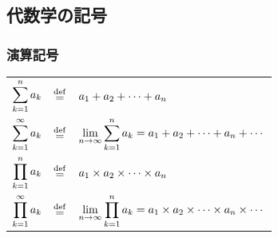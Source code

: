 \documentclass[a4j, 9pt]{ltjsarticle}
\begin{document}
    \subsection{代数学の記号}
      \subsubsection{演算記号}

        \begin{center}
          \begin{tablehere}
            \centering
            \begin{tabular}{rcl}
              
              $\displaystyle \sum_{k=1}^n a_k$      & $\displaystyle \stackrel{\mathrm{def}}{=}$  & $\displaystyle a_1 + a_2 + \cdots + a_n$\\ 
              $\displaystyle \sum_{k=1}^\infty a_k$ & $\displaystyle \stackrel{\mathrm{def}}{=}$  & $\displaystyle \lim_{n \to \infty}\sum_{k=1}^n a_k = a_1 + a_2 + \cdots + a_n + \cdots$\\ 
              $\displaystyle \prod_{k=1}^n a_k$     & $\displaystyle \stackrel{\mathrm{def}}{=}$  & $\displaystyle a_1 \times a_2 \times \cdots \times a_n$\\ 
              $\displaystyle \prod_{k=1}^\infty a_k$& $\displaystyle \stackrel{\mathrm{def}}{=}$  & $\displaystyle \lim_{n \to \infty}\prod_{k=1}^n a_k = a_1 \times a_2 \times \cdots \times a_n \times \cdots$\\ 
              
            \end{tabular}
          \end{tablehere}
        \end{center}
\end{document}
